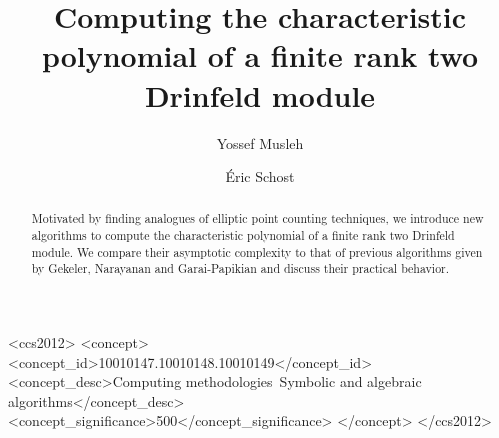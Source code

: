 \documentclass[sigconf]{acmart}
\begin{document}
\title{Computing the characteristic polynomial of a finite rank two Drinfeld module}

\author{Yossef Musleh}

\author{\'Eric Schost}



\begin{abstract}
  Motivated by finding analogues of elliptic point counting
  techniques, we introduce new algorithms to compute the
  characteristic polynomial of a finite rank two Drinfeld module. We
  compare their asymptotic complexity to that of previous algorithms
  given by Gekeler, Narayanan and Garai-Papikian and discuss their 
  practical behavior.
\end{abstract}

\begin{CCSXML}
<ccs2012>
<concept>
<concept_id>10010147.10010148.10010149</concept_id>
<concept_desc>Computing methodologies~Symbolic and algebraic algorithms</concept_desc>
<concept_significance>500</concept_significance>
</concept>
</ccs2012>
\end{CCSXML}




\setcounter{secnumdepth}{4}
\renewcommand{\theparagraph}{\thesubsection.\arabic{paragraph}}
\titleformat{\paragraph}[runin]{\normalfont\normalsize\bfseries}{\theparagraph.}{1em}{}
\titlespacing*{\paragraph}{0em}{1ex}{1em}
\newcommand{\pref}[1]{{\bf\ref{#1}}}

\maketitle
\end{document}
